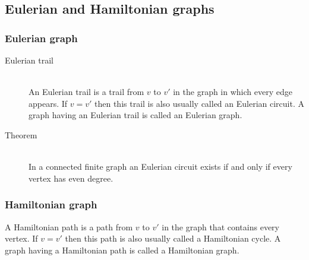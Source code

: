 \documentclass[margin=0px]{article}
\begin{document}
\subsection{Eulerian and Hamiltonian graphs}
\subsubsection{Eulerian graph}
\begin{description}
    \item[Eulerian trail] \hfill \\
        An Eulerian trail is a trail from $v$ to $v'$ in the graph in which every edge appears. If $v=v'$ then this trail is also usually called an Eulerian circuit. A graph having an Eulerian trail is called an Eulerian graph.
    \item[Theorem] \hfill \\
        In a connected finite graph an Eulerian circuit exists if and only if every vertex has even degree.
\end{description}
\subsubsection{Hamiltonian graph}
A Hamiltonian path is a path from $v$ to $v'$ in the graph that contains every vertex. If $v=v'$ then this path is also usually called a Hamiltonian cycle. A graph having a Hamiltonian path is called a Hamiltonian graph.
\end{document}
